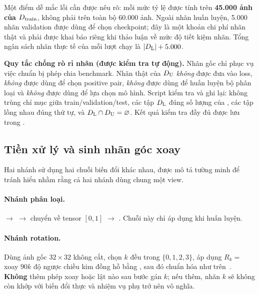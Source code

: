 

Một điểm dễ mắc lỗi cần được nêu rõ: mỗi mức tỷ lệ được tính trên \textbf{45.000 ảnh của
$D_{\mathrm{train}}$}, không phải trên toàn bộ 60.000 ảnh. Ngoài nhãn huấn luyện, 5.000 nhãn validation
được dùng để chọn checkpoint; đây là một khoản chi phí nhãn thật và phải được khai báo riêng
khi thảo luận về mức độ tiết kiệm nhãn. Tổng ngân sách nhãn thực tế của mỗi lượt chạy là
$|D_{\mathrm{L}}| + 5.000$.

\begin{keybox}
\textbf{Quy tắc chống rò rỉ nhãn (được kiểm tra tự động).} Nhãn gốc chỉ phục vụ việc chuẩn bị
phép chia benchmark. Nhãn thật của $D_{\mathrm{U}}$ \emph{không} được đưa vào loss, \emph{không} được
dùng để chọn positive pair, \emph{không} được dùng để huấn luyện bộ phân loại và \emph{không}
được dùng để lựa chọn mô hình. Script  kiểm tra và ghi lại:
không trùng chỉ mục giữa train/validation/test, các tập $D_{\mathrm{L}}$ đúng số lượng của
, các tập lồng nhau đúng thứ tự, và $D_{\mathrm{L}} \cap D_{\mathrm{U}} = \varnothing$.
Kết quả kiểm tra đầy đủ được lưu trong .
\end{keybox}

\subsection{Tiền xử lý và sinh nhãn góc xoay}
\label{sec:data-aug}

Hai nhánh sử dụng hai chuỗi biến đổi khác nhau, được mô tả tường minh để tránh hiểu nhầm rằng
cả hai nhánh dùng chung một view.

\paragraph{Nhánh phân loại.}
 $\rightarrow$  $\rightarrow$
chuyển về tensor $[0,1]$ $\rightarrow$ . Chuỗi này chỉ áp dụng khi huấn luyện.

\paragraph{Nhánh rotation.}
Dùng ảnh gốc $32 \times 32$ không cắt, chọn $k$ đều trong $\{0,1,2,3\}$, áp dụng
$R_k = $ xoay $90k$ độ ngược chiều kim đồng hồ bằng , sau đó chuẩn hóa như
trên~\cite{pytorch_rot90}. \textbf{Không} thêm phép xoay hoặc lật nào sau bước gán $k$; nếu
thêm, nhãn $k$ sẽ không còn khớp với biến đổi thực và nhiệm vụ phụ trở nên vô nghĩa.

